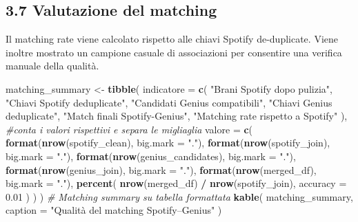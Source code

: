 \documentclass[
]{article}
\newenvironment{Shaded}{\begin{snugshade}}{\end{snugshade}}
\newcommand{\AttributeTok}[1]{\textcolor[rgb]{0.13,0.29,0.53}{#1}}
\newcommand{\CommentTok}[1]{\textcolor[rgb]{0.56,0.35,0.01}{\textit{#1}}}
\newcommand{\FloatTok}[1]{\textcolor[rgb]{0.00,0.00,0.81}{#1}}
\newcommand{\FunctionTok}[1]{\textcolor[rgb]{0.13,0.29,0.53}{\textbf{#1}}}
\newcommand{\NormalTok}[1]{#1}
\newcommand{\OtherTok}[1]{\textcolor[rgb]{0.56,0.35,0.01}{#1}}
\newcommand{\SpecialCharTok}[1]{\textcolor[rgb]{0.81,0.36,0.00}{\textbf{#1}}}
\newcommand{\StringTok}[1]{\textcolor[rgb]{0.31,0.60,0.02}{#1}}
\begin{document}
\subsection{3.7 Valutazione del
matching}\label{valutazione-del-matching}

Il matching rate viene calcolato rispetto alle chiavi Spotify
de-duplicate. Viene inoltre mostrato un campione casuale di associazioni
per consentire una verifica manuale della qualità.

\begin{Shaded}
\begin{Highlighting}[]
\NormalTok{matching\_summary }\OtherTok{\textless{}{-}} \FunctionTok{tibble}\NormalTok{(}
  \AttributeTok{indicatore =} \FunctionTok{c}\NormalTok{(}
    \StringTok{"Brani Spotify dopo pulizia"}\NormalTok{,}
    \StringTok{"Chiavi Spotify deduplicate"}\NormalTok{,}
    \StringTok{"Candidati Genius compatibili"}\NormalTok{,}
    \StringTok{"Chiavi Genius deduplicate"}\NormalTok{,}
    \StringTok{"Match finali Spotify{-}Genius"}\NormalTok{,}
    \StringTok{"Matching rate rispetto a Spotify"}
\NormalTok{  ),}
  \CommentTok{\#conta i valori rispettivi e separa le migliaglia}
  \AttributeTok{valore =} \FunctionTok{c}\NormalTok{(}
    \FunctionTok{format}\NormalTok{(}\FunctionTok{nrow}\NormalTok{(spotify\_clean), }\AttributeTok{big.mark =} \StringTok{"."}\NormalTok{),}
    \FunctionTok{format}\NormalTok{(}\FunctionTok{nrow}\NormalTok{(spotify\_join), }\AttributeTok{big.mark =} \StringTok{"."}\NormalTok{),}
    \FunctionTok{format}\NormalTok{(}\FunctionTok{nrow}\NormalTok{(genius\_candidates), }\AttributeTok{big.mark =} \StringTok{"."}\NormalTok{),}
    \FunctionTok{format}\NormalTok{(}\FunctionTok{nrow}\NormalTok{(genius\_join), }\AttributeTok{big.mark =} \StringTok{"."}\NormalTok{),}
    \FunctionTok{format}\NormalTok{(}\FunctionTok{nrow}\NormalTok{(merged\_df), }\AttributeTok{big.mark =} \StringTok{"."}\NormalTok{),}
    \FunctionTok{percent}\NormalTok{(}
      \FunctionTok{nrow}\NormalTok{(merged\_df) }\SpecialCharTok{/} \FunctionTok{nrow}\NormalTok{(spotify\_join),}
      \AttributeTok{accuracy =} \FloatTok{0.01}
\NormalTok{    )}
\NormalTok{  )}
\NormalTok{)}
\CommentTok{\# Matching summary su tabella formattata}
\FunctionTok{kable}\NormalTok{(}
\NormalTok{  matching\_summary,}
  \AttributeTok{caption =} \StringTok{"Qualità del matching Spotify–Genius"}
\NormalTok{)}
\end{Highlighting}
\end{Shaded}
\end{document}
